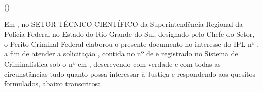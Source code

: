 \noindent\textbf{\MakeUppercase{\pfdocnamenum}}

\begin{center}
	\bigskip
	\textbf{\MakeUppercase{\pfdoctitle}}
	
	\ifx\pfdocsubtitle\empty
	\else
		(\MakeUppercase{\pfdocsubtitle})
	\fi
\end{center}

\bigskip

Em 
\pfdocdate,	no SETOR TÉCNICO-CIENTÍFICO da Superintendência
Regional da Polícia Federal no Estado do Rio Grande do Sul, designado pelo Chefe do Setor,	o Perito Criminal Federal 
\MakeUppercase{\pfauthor}\space elaborou o presente documento no interesse do IPL nº 
\pfipl, a fim de atender a solicitação 
\pfclient, contida no 
\pfexptype\space nº \pfexpnum\space de \pfexpdate\space	e registrado no Sistema de Criminalística sob o nº 
\pfregnum\space em \pfregdate, descrevendo com verdade e com todas as circunstâncias tudo quanto possa interessar à Justiça e respondendo aos quesitos formulados, abaixo transcritos:

